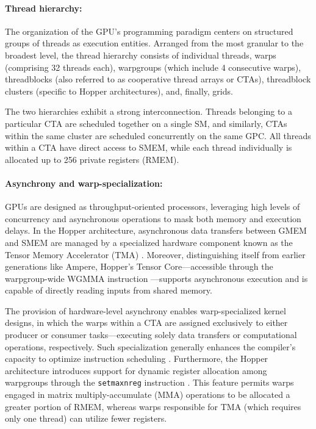 \begin{enumerate}
\paragraph{Thread hierarchy:} The organization of the GPU's programming paradigm centers on structured groups of threads as execution entities. Arranged from the most granular to the broadest level, the thread hierarchy consists of individual threads, warps (comprising 32 threads each), warpgroups (which include 4 consecutive warps), threadblocks (also referred to as cooperative thread arrays or CTAs), threadblock clusters (specific to Hopper architectures), and, finally, grids.

The two hierarchies exhibit a strong interconnection. Threads belonging to a particular CTA are scheduled together on a single SM, and similarly, CTAs within the same cluster are scheduled concurrently on the same GPC. All threads within a CTA have direct access to SMEM, while each thread individually is allocated up to 256 private registers (RMEM).

\paragraph{Asynchrony and warp-specialization:}

GPUs are designed as throughput-oriented processors, leveraging high levels of concurrency and asynchronous operations to mask both memory and execution delays. In the Hopper architecture, asynchronous data transfers between GMEM and SMEM are managed by a specialized hardware component known as the Tensor Memory Accelerator (TMA) \cite[\S7.29]{cuda}. Moreover, distinguishing itself from earlier generations like Ampere, Hopper’s Tensor Core—accessible through the warpgroup-wide WGMMA instruction \cite[\S9.7.14]{ptx}—supports asynchronous execution and is capable of directly reading inputs from shared memory.

The provision of hardware-level asynchrony enables warp-specialized kernel designs, in which the warps within a CTA are assigned exclusively to either producer or consumer tasks—executing solely data transfers or computational operations, respectively. Such specialization generally enhances the compiler’s capacity to optimize instruction scheduling \citep{warp-specialization-2011}. Furthermore, the Hopper architecture introduces support for dynamic register allocation among warpgroups through the \verb|setmaxnreg| instruction \cite[\S9.7.17.1]{ptx}. This feature permits warps engaged in matrix multiply-accumulate (MMA) operations to be allocated a greater portion of RMEM, whereas warps responsible for TMA (which requires only one thread) can utilize fewer registers.


\end{enumerate}
